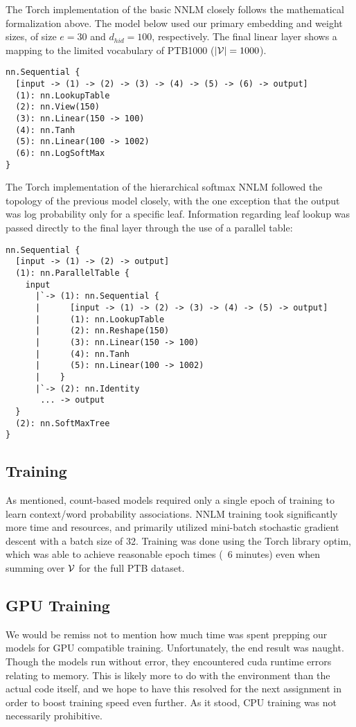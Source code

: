 \documentclass[11pt]{article}
\begin{document}
The Torch implementation of the basic NNLM closely follows the mathematical formalization above. The model below used our primary embedding and weight sizes, of size $e=30$ and $d_{hid} = 100$, respectively. The final linear layer shows a mapping to the limited vocabulary of PTB1000 ($|\mathcal{V}| = 1000$).
\begin{verbatim}
nn.Sequential {
  [input -> (1) -> (2) -> (3) -> (4) -> (5) -> (6) -> output]
  (1): nn.LookupTable
  (2): nn.View(150)
  (3): nn.Linear(150 -> 100)
  (4): nn.Tanh
  (5): nn.Linear(100 -> 1002)
  (6): nn.LogSoftMax
}
\end{verbatim}

The Torch implementation of the hierarchical softmax NNLM followed the topology of the previous model closely, with the one exception that the output was log probability only for a specific leaf. Information regarding leaf lookup was passed directly to the final layer through the use of a parallel table:
\begin{verbatim}
nn.Sequential {
  [input -> (1) -> (2) -> output]
  (1): nn.ParallelTable {
    input
      |`-> (1): nn.Sequential {
      |      [input -> (1) -> (2) -> (3) -> (4) -> (5) -> output]
      |      (1): nn.LookupTable
      |      (2): nn.Reshape(150)
      |      (3): nn.Linear(150 -> 100)
      |      (4): nn.Tanh
      |      (5): nn.Linear(100 -> 1002)
      |    }
      |`-> (2): nn.Identity
       ... -> output
  }
  (2): nn.SoftMaxTree
}
\end{verbatim}

\subsection{Training}
As mentioned, count-based models required only a single epoch of training to learn context/word probability associations. NNLM training took significantly more time and resources, and primarily utilized mini-batch stochastic gradient descent with a batch size of 32. Training was done using the Torch library optim, which was able to achieve reasonable epoch times (~6 minutes) even when summing over $\mathcal{V}$ for the full PTB dataset.

\subsection{GPU Training}
We would be remiss not to mention how much time was spent prepping our models for GPU compatible training. Unfortunately, the end result was naught. Though the models run without error, they encountered cuda runtime errors relating to memory. This is likely more to do with the environment than the actual code itself, and we hope to have this resolved for the next assignment in order to boost training speed even further. As it stood, CPU training was not necessarily prohibitive.
\end{document}
